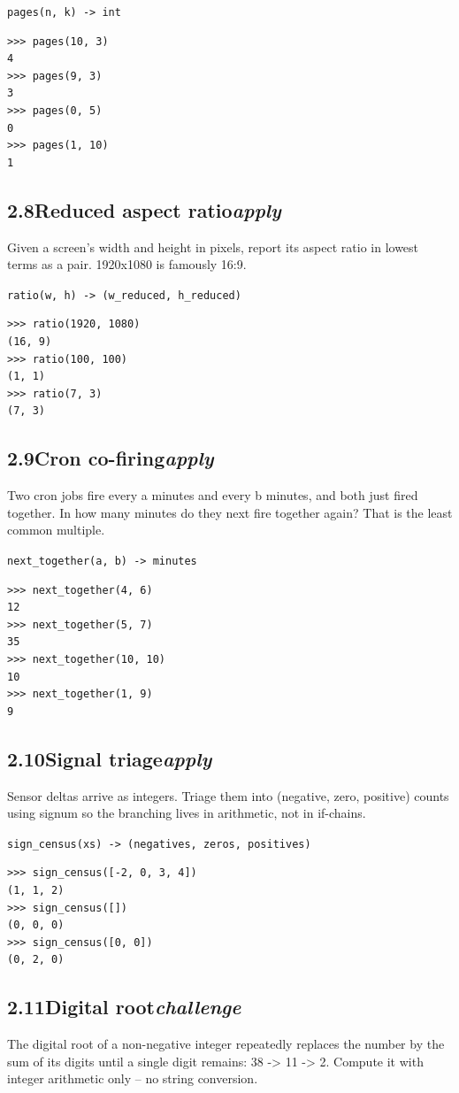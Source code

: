 \documentclass[10pt,letterpaper]{book}
\begin{document}
\noindent\texttt{pages(n, k) -> int}
\begin{lstlisting}[style=ex]
>>> pages(10, 3)
4
>>> pages(9, 3)
3
>>> pages(0, 5)
0
>>> pages(1, 10)
1
\end{lstlisting}
\subsection*{2.8\quad Reduced aspect ratio\hfill\textnormal{\textit{apply}}}
Given a screen's width and height in pixels, report its aspect ratio in lowest terms as a pair. 1920x1080 is famously 16:9.

\noindent\texttt{ratio(w, h) -> (w\_reduced, h\_reduced)}
\begin{lstlisting}[style=ex]
>>> ratio(1920, 1080)
(16, 9)
>>> ratio(100, 100)
(1, 1)
>>> ratio(7, 3)
(7, 3)
\end{lstlisting}
\subsection*{2.9\quad Cron co-firing\hfill\textnormal{\textit{apply}}}
Two cron jobs fire every a minutes and every b minutes, and both just fired together. In how many minutes do they next fire together again? That is the least common multiple.

\noindent\texttt{next\_together(a, b) -> minutes}
\begin{lstlisting}[style=ex]
>>> next_together(4, 6)
12
>>> next_together(5, 7)
35
>>> next_together(10, 10)
10
>>> next_together(1, 9)
9
\end{lstlisting}
\subsection*{2.10\quad Signal triage\hfill\textnormal{\textit{apply}}}
Sensor deltas arrive as integers. Triage them into (negative, zero, positive) counts using signum so the branching lives in arithmetic, not in if-chains.

\noindent\texttt{sign\_census(xs) -> (negatives, zeros, positives)}
\begin{lstlisting}[style=ex]
>>> sign_census([-2, 0, 3, 4])
(1, 1, 2)
>>> sign_census([])
(0, 0, 0)
>>> sign_census([0, 0])
(0, 2, 0)
\end{lstlisting}

\subsection*{2.11\quad Digital root\hfill\textnormal{\textit{challenge}}}
The digital root of a non-negative integer repeatedly replaces the number by the sum of its digits until a single digit remains: 38 -> 11 -> 2. Compute it with integer arithmetic only -- no string conversion.
\end{document}
